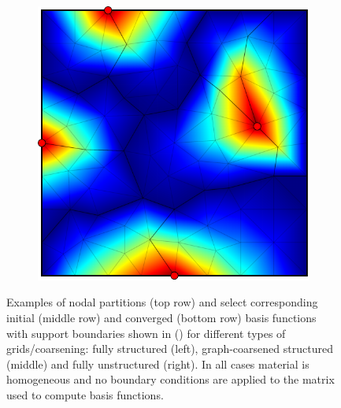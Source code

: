 \begin{figure}[htbp]
\begin{subfigure}[t]{0.3\textwidth}
  \end{subfigure}
  \hfill
  \begin{subfigure}[t]{0.3\textwidth}
    \centerline{\includegraphics[width=0.9\linewidth]{figs/square_tria_metis_node_conv}}
  \end{subfigure}
  \caption[Nodal partitions and basis function examples]{\label{fig:square_node_basis} Examples of nodal partitions (top row) and select corresponding initial (middle row) and converged (bottom row) basis functions with support boundaries shown in () for different types of grids/coarsening: fully structured (left), graph-coarsened structured (middle) and fully unstructured (right).   In all cases material is homogeneous and no boundary conditions are applied to the matrix used to compute basis functions.}
\end{figure}

